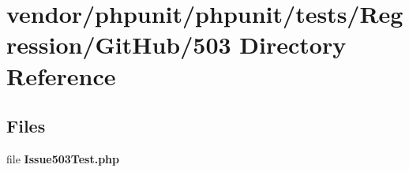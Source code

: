 \section{vendor/phpunit/phpunit/tests/\+Regression/\+Git\+Hub/503 Directory Reference}
\label{dir_b8106da051ade565b4cdb5eda7a3c2b9}
\subsection*{Files}
\begin{DoxyCompactItemize}
\item 
file {\bf Issue503\+Test.\+php}
\end{DoxyCompactItemize}
